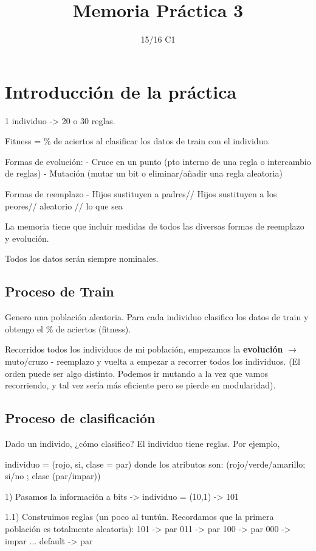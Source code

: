 \documentclass[nochap]{apuntes}
\title{Memoria Práctica 3}
\author{}
\date{15/16 C1}
\begin{document}
\pagestyle{plain}
\maketitle

\tableofcontents
\newpage

\section{Introducción de la práctica}
1 individuo -> 20 o 30 reglas.

Fitness = \% de aciertos al clasificar los datos de train con el individuo.

Formas de evolución:
- Cruce en un punto (pto interno de una regla o intercambio de reglas)
- Mutación (mutar un bit o eliminar/añadir una regla aleatoria)

Formas de reemplazo
- Hijos sustituyen a padres// Hijos sustituyen a los peores// aleatorio // lo que sea


La memoria tiene que incluir medidas de todos las diversas formas de reemplazo y evolución. 

Todos los datos serán siempre nominales.

\subsection{Proceso de Train}

Genero una población aleatoria. Para cada individuo clasifico los datos de train y obtengo el \% de aciertos (fitness). 

Recorridos todos los individuos de mi población, empezamos la \textbf{evolución} $\to$ muto/cruzo - reemplazo y vuelta a empezar a recorrer todos los individuos. (El orden puede ser algo distinto. Podemos ir mutando a la vez que vamos recorriendo, y tal vez sería más eficiente pero se pierde en modularidad).

\subsection{Proceso de clasificación}

Dado un individo, ¿cómo clasifico? El individuo tiene reglas. Por ejemplo,

individuo  = (rojo, si, clase = par) donde los atributos son: (rojo/verde/amarillo; si/no ; clase (par/impar))

1) Pasamos la información a bits -> individuo = (10,1) -> 101

1.1) Construimos reglas (un poco al tuntún. Recordamos que la primera población es totalmente aleatoria):
	101 -> par
	011 -> par
	100 -> par
	000 -> impar
	...
	default -> par
\end{document}
